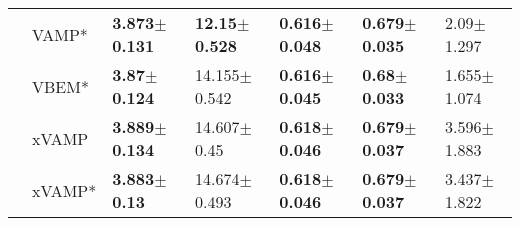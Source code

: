 \begin{tabular}{lllllll}
                 & VAMP* &  \textbf{3.873$\pm$0.131} &   \textbf{12.15$\pm$0.528} &  \textbf{0.616$\pm$0.048} &  \textbf{0.679$\pm$0.035} &            2.09$\pm$1.297 \\
                 & VBEM* &   \textbf{3.87$\pm$0.124} &           14.155$\pm$0.542 &  \textbf{0.616$\pm$0.045} &   \textbf{0.68$\pm$0.033} &           1.655$\pm$1.074 \\
                 & xVAMP &  \textbf{3.889$\pm$0.134} &            14.607$\pm$0.45 &  \textbf{0.618$\pm$0.046} &  \textbf{0.679$\pm$0.037} &           3.596$\pm$1.883 \\
                 & xVAMP* &   \textbf{3.883$\pm$0.13} &           14.674$\pm$0.493 &  \textbf{0.618$\pm$0.046} &  \textbf{0.679$\pm$0.037} &           3.437$\pm$1.822 \\
\bottomrule
\end{tabular}

